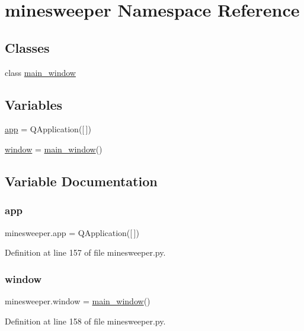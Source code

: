 \hypertarget{namespaceminesweeper}{}\section{minesweeper Namespace Reference}
\label{namespaceminesweeper}
\subsection*{Classes}
\begin{DoxyCompactItemize}
\item 
class \mbox{\hyperlink{classminesweeper_1_1main__window}{main\+\_\+window}}
\end{DoxyCompactItemize}
\subsection*{Variables}
\begin{DoxyCompactItemize}
\item 
\mbox{\hyperlink{namespaceminesweeper_a2211849d28ff8d7bfe0918c610310322}{app}} = Q\+Application(\mbox{[}$\,$\mbox{]})
\item 
\mbox{\hyperlink{namespaceminesweeper_a80cc81c5aa455fb1b4762add4b4d730c}{window}} = \mbox{\hyperlink{classminesweeper_1_1main__window}{main\+\_\+window}}()
\end{DoxyCompactItemize}


\subsection{Variable Documentation}
\mbox{\label{namespaceminesweeper_a2211849d28ff8d7bfe0918c610310322}} 
\subsubsection{\texorpdfstring{app}{app}}
{\footnotesize\ttfamily minesweeper.\+app = Q\+Application(\mbox{[}$\,$\mbox{]})}



Definition at line 157 of file minesweeper.\+py.

\mbox{\label{namespaceminesweeper_a80cc81c5aa455fb1b4762add4b4d730c}} 
\subsubsection{\texorpdfstring{window}{window}}
{\footnotesize\ttfamily minesweeper.\+window = \mbox{\hyperlink{classminesweeper_1_1main__window}{main\+\_\+window}}()}



Definition at line 158 of file minesweeper.\+py.

